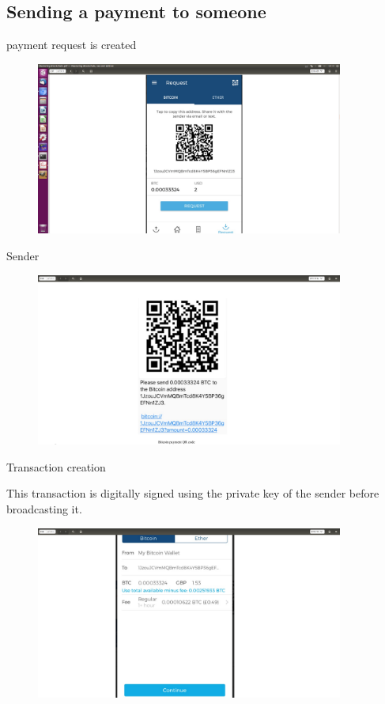 \documentclass[serif]{beamer}
\begin{document}
\subsection{Sending a payment to someone}
\begin{frame}{payment request is created}
		\begin{figure}
			\includegraphics[width=0.9\textwidth]{request}
			\label{fig:request}
		\end{figure}
\end{frame}
\begin{frame}{Sender}
	\begin{figure}
		\includegraphics[width=0.9\textwidth]{sender}
		\label{fig:request2}
	\end{figure}
	
\end{frame}
\begin{frame}{Transaction creation}

		This transaction is digitally signed using the private key of the sender
		before broadcasting it.
			\begin{figure}
				\includegraphics[width=0.9\textwidth]{result}
				\label{fig:result}
			\end{figure}

	\end{frame}
	
\end{document}
